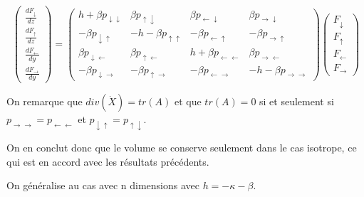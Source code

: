 \documentclass[12pt]{article}
\begin{document}
\begin{equation}
    \begin{pmatrix}
        \frac{dF_{\downarrow}}{dz}\\[4pt]
        \frac{dF_{\uparrow}}{dz}\\[4pt]
        \frac{dF_{\leftarrow}}{dy}\\[4pt]
        \frac{dF_{\rightarrow}}{dy}
    \end{pmatrix}=
    \begin{pmatrix}
        h+\beta p_{{\downarrow}{\downarrow}} & \beta p_{{\uparrow}{\downarrow}} & \beta p_{{\leftarrow}{\downarrow}} & \beta p_{{\rightarrow}{\downarrow}} \\
         -\beta p_{{\downarrow}{\uparrow}} & -h-\beta p_{{\uparrow}{\uparrow}} &  -\beta p_{{\leftarrow}{\uparrow}} &  -\beta p_{{\rightarrow}{\uparrow}} \\
        \beta p_{{\downarrow}{\leftarrow}} & \beta p_{{\uparrow}{\leftarrow}} & h +\beta p_{{\leftarrow}{\leftarrow}} & \beta p_{{\rightarrow}{\leftarrow}} \\
         -\beta p_{{\downarrow}{\rightarrow}} &  -\beta p_{{\uparrow}{\rightarrow}} &  -\beta p_{{\leftarrow}{\rightarrow}} & -h -\beta p_{{\rightarrow}{\rightarrow}} 
    \end{pmatrix}
    \begin{pmatrix}
        F_{\downarrow}\\
        F_{\uparrow}\\
        F_{\leftarrow}\\
        F_{\rightarrow}
    \end{pmatrix}
    \label{eq:Flux Matriciel 4 direction}
\end{equation}\par
On remarque que  $div(\dot{X})=tr(A)$ et que   $tr(A)=0$ si et seulement si $p_{{\rightarrow}{\rightarrow}}=p_{{\leftarrow}{\leftarrow}}$ et $p_{{\downarrow}{\uparrow}}=p_{{\uparrow}{\downarrow}}$. \par On en conclut donc que le volume se conserve seulement dans le cas isotrope, ce qui est en accord avec les résultats précédents.\par
    
On généralise au cas avec n dimensions avec $h=-\kappa -\beta$.
\end{document}
